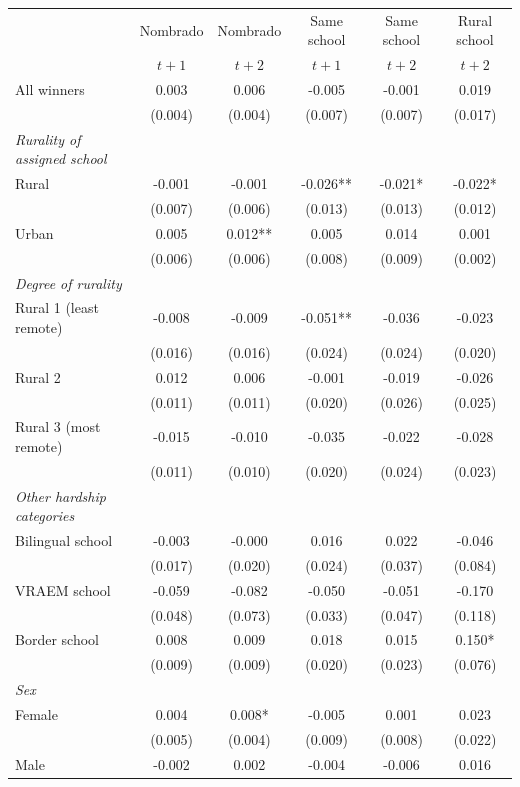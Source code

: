 \begin{tabular}{lccccc}
\toprule
 & Nombrado & Nombrado & Same school & Same school & Rural school \\
 & $t+1$ & $t+2$ & $t+1$ & $t+2$ & $t+2$ \\
\midrule
All winners & 0.003 & 0.006 & -0.005 & -0.001 & 0.019 \\
 & (0.004) & (0.004) & (0.007) & (0.007) & (0.017) \\
\addlinespace
\emph{Rurality of assigned school} \\
\quad Rural & -0.001 & -0.001 & -0.026** & -0.021* & -0.022* \\
 & (0.007) & (0.006) & (0.013) & (0.013) & (0.012) \\
\quad Urban & 0.005 & 0.012** & 0.005 & 0.014 & 0.001 \\
 & (0.006) & (0.006) & (0.008) & (0.009) & (0.002) \\
\addlinespace
\emph{Degree of rurality} \\
\quad Rural 1 (least remote) & -0.008 & -0.009 & -0.051** & -0.036 & -0.023 \\
 & (0.016) & (0.016) & (0.024) & (0.024) & (0.020) \\
\quad Rural 2 & 0.012 & 0.006 & -0.001 & -0.019 & -0.026 \\
 & (0.011) & (0.011) & (0.020) & (0.026) & (0.025) \\
\quad Rural 3 (most remote) & -0.015 & -0.010 & -0.035 & -0.022 & -0.028 \\
 & (0.011) & (0.010) & (0.020) & (0.024) & (0.023) \\
\addlinespace
\emph{Other hardship categories} \\
\quad Bilingual school & -0.003 & -0.000 & 0.016 & 0.022 & -0.046 \\
 & (0.017) & (0.020) & (0.024) & (0.037) & (0.084) \\
\quad VRAEM school & -0.059 & -0.082 & -0.050 & -0.051 & -0.170 \\
 & (0.048) & (0.073) & (0.033) & (0.047) & (0.118) \\
\quad Border school & 0.008 & 0.009 & 0.018 & 0.015 & 0.150* \\
 & (0.009) & (0.009) & (0.020) & (0.023) & (0.076) \\
\addlinespace
\emph{Sex} \\
\quad Female & 0.004 & 0.008* & -0.005 & 0.001 & 0.023 \\
 & (0.005) & (0.004) & (0.009) & (0.008) & (0.022) \\
\quad Male & -0.002 & 0.002 & -0.004 & -0.006 & 0.016 \\

\end{tabular}

